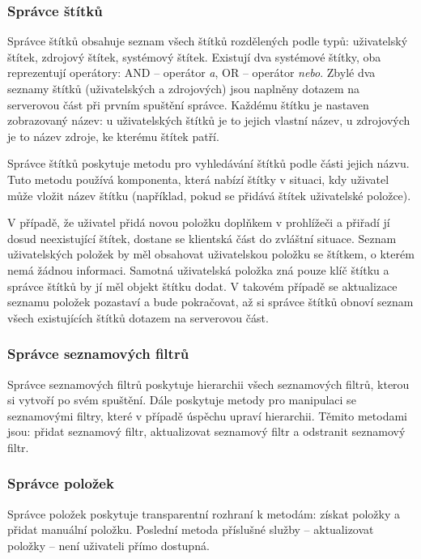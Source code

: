 \subsubsection{Správce štítků}

Správce štítků obsahuje seznam všech štítků rozdělených podle typů: uživatelský štítek, zdrojový štítek, systémový štítek.
Existují dva systémové štítky, oba reprezentují operátory: AND -- operátor \textit{a}, OR -- operátor \textit{nebo}.
Zbylé dva seznamy štítků (uživatelských a zdrojových) jsou naplněny dotazem na serverovou část při prvním spuštění správce.
Každému štítku je nastaven zobrazovaný název: u uživatelských štítků je to jejich vlastní název, u zdrojových je to název zdroje, ke kterému štítek patří.

Správce štítků poskytuje metodu pro vyhledávání štítků podle části jejich názvu.
Tuto metodu používá komponenta, která nabízí štítky v situaci, kdy uživatel může vložit název štítku (například, pokud se přidává štítek uživatelské položce).

V případě, že uživatel přidá novou položku doplňkem v prohlížeči a přiřadí jí dosud neexistující štítek, dostane se klientská část do zvláštní situace.
Seznam uživatelských položek by měl obsahovat uživatelskou položku se štítkem, o kterém nemá žádnou informaci.
Samotná uživatelská položka zná pouze klíč štítku a správce štítků by jí měl objekt štítku dodat.
V takovém případě se aktualizace seznamu položek pozastaví a bude pokračovat, až si správce štítků obnoví seznam všech existujících štítků dotazem na serverovou část.

\subsubsection{Správce seznamových filtrů}

Správce seznamových filtrů poskytuje hierarchii všech seznamových filtrů, kterou si vytvoří po svém spuštění.
Dále poskytuje metody pro manipulaci se seznamovými filtry, které v případě úspěchu upraví hierarchii.
Těmito metodami jsou: přidat seznamový filtr, aktualizovat seznamový filtr a odstranit seznamový filtr.

\subsubsection{Správce položek}

Správce položek poskytuje transparentní rozhraní k metodám: získat položky a přidat manuální položku.
Poslední metoda příslušné služby -- aktualizovat položky -- není uživateli přímo dostupná.

